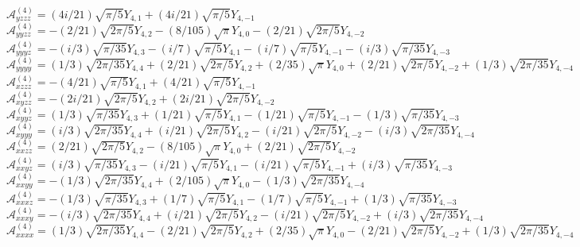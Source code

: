 \documentclass{article}
\begin{document}
${\mathcal A}^{(4)}_{yzzz} =
(4i/21)\sqrt{\pi/5}Y_{4,1}
 +(4i/21)\sqrt{\pi/5}Y_{4,-1}$\\
${\mathcal A}^{(4)}_{yyzz} =
 -(2/21)\sqrt{2\pi/5}Y_{4,2}
 -(8/105)\sqrt{\pi}Y_{4,0}
 -(2/21)\sqrt{2\pi/5}Y_{4,-2}$\\
${\mathcal A}^{(4)}_{yyyz} =
 -(i/3)\sqrt{\pi/35}Y_{4,3}
 -(i/7)\sqrt{\pi/5}Y_{4,1}
 -(i/7)\sqrt{\pi/5}Y_{4,-1}
 -(i/3)\sqrt{\pi/35}Y_{4,-3}$\\
${\mathcal A}^{(4)}_{yyyy} =
(1/3)\sqrt{2\pi/35}Y_{4,4}
 +(2/21)\sqrt{2\pi/5}Y_{4,2}
 +(2/35)\sqrt{\pi}Y_{4,0}
 +(2/21)\sqrt{2\pi/5}Y_{4,-2}
 +(1/3)\sqrt{2\pi/35}Y_{4,-4}$\\
${\mathcal A}^{(4)}_{xzzz} =
 -(4/21)\sqrt{\pi/5}Y_{4,1}
 +(4/21)\sqrt{\pi/5}Y_{4,-1}$\\
${\mathcal A}^{(4)}_{xyzz} =
 -(2i/21)\sqrt{2\pi/5}Y_{4,2}
 +(2i/21)\sqrt{2\pi/5}Y_{4,-2}$\\
${\mathcal A}^{(4)}_{xyyz} =
(1/3)\sqrt{\pi/35}Y_{4,3}
 +(1/21)\sqrt{\pi/5}Y_{4,1}
 -(1/21)\sqrt{\pi/5}Y_{4,-1}
 -(1/3)\sqrt{\pi/35}Y_{4,-3}$\\
${\mathcal A}^{(4)}_{xyyy} =
(i/3)\sqrt{2\pi/35}Y_{4,4}
 +(i/21)\sqrt{2\pi/5}Y_{4,2}
 -(i/21)\sqrt{2\pi/5}Y_{4,-2}
 -(i/3)\sqrt{2\pi/35}Y_{4,-4}$\\
${\mathcal A}^{(4)}_{xxzz} =
(2/21)\sqrt{2\pi/5}Y_{4,2}
 -(8/105)\sqrt{\pi}Y_{4,0}
 +(2/21)\sqrt{2\pi/5}Y_{4,-2}$\\
${\mathcal A}^{(4)}_{xxyz} =
(i/3)\sqrt{\pi/35}Y_{4,3}
 -(i/21)\sqrt{\pi/5}Y_{4,1}
 -(i/21)\sqrt{\pi/5}Y_{4,-1}
 +(i/3)\sqrt{\pi/35}Y_{4,-3}$\\
${\mathcal A}^{(4)}_{xxyy} =
 -(1/3)\sqrt{2\pi/35}Y_{4,4}
 +(2/105)\sqrt{\pi}Y_{4,0}
 -(1/3)\sqrt{2\pi/35}Y_{4,-4}$\\
${\mathcal A}^{(4)}_{xxxz} =
 -(1/3)\sqrt{\pi/35}Y_{4,3}
 +(1/7)\sqrt{\pi/5}Y_{4,1}
 -(1/7)\sqrt{\pi/5}Y_{4,-1}
 +(1/3)\sqrt{\pi/35}Y_{4,-3}$\\
${\mathcal A}^{(4)}_{xxxy} =
 -(i/3)\sqrt{2\pi/35}Y_{4,4}
 +(i/21)\sqrt{2\pi/5}Y_{4,2}
 -(i/21)\sqrt{2\pi/5}Y_{4,-2}
 +(i/3)\sqrt{2\pi/35}Y_{4,-4}$\\
${\mathcal A}^{(4)}_{xxxx} =
(1/3)\sqrt{2\pi/35}Y_{4,4}
 -(2/21)\sqrt{2\pi/5}Y_{4,2}
 +(2/35)\sqrt{\pi}Y_{4,0}
 -(2/21)\sqrt{2\pi/5}Y_{4,-2}
 +(1/3)\sqrt{2\pi/35}Y_{4,-4}$\\
\end{document}
